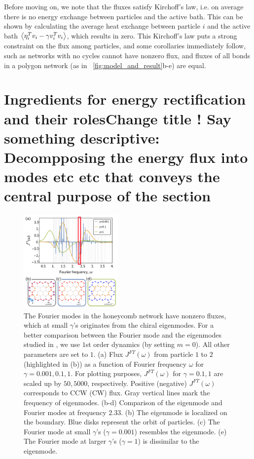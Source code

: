 \documentclass[
 preprint,
 preprintnumbers,
 amsmath,amssymb,
 aps,
 pre,
 longbibliography,
 10pt, twocolumn
]{revtex4-1}
\begin{document}
Before moving on, we note that the fluxes satisfy Kirchoff's law, i.e. on average there is no energy exchange between particles and the active bath. This can be shown by calculating the average heat exchange between particle $i$ and the active bath $\expval{\eta_i^T v_i - \gamma v_i^T v_i}$, which results in zero.
This Kirchoff's law puts a strong constraint on the flux among particles, and some corollaries immediately follow, such as networks with no cycles cannot have nonzero flux, and fluxes of all bonds in a polygon network (as in \figurename~\ref{fig:model_and_result}b-e) are equal.


\section{Ingredients for energy rectification and their roles{\bf Change title ! Say something descriptive: Decompposing the energy flux into modes etc etc that conveys the central purpose of the section}} \label{sec:fourier}

\begin{figure}[ht]
	\centering
	\includegraphics[width=0.45\textwidth]{2_Fourier_modes.pdf}
    \caption{The Fourier modes in the honeycomb network have nonzero fluxes, which at small $\gamma$'s originates from the chiral eigenmodes. For a better comparison between the Fourier mode and the eigenmodes studied in \cite{Nash2015TopologicalMetamaterials}, we use $1$st order dynamics (by setting $m=0$). All other parameters are set to $1$. 
    (a) Flux $J^{FT}(\omega)$ from particle $1$ to $2$ (highlighted in (b)) as a function of Fourier frequency $\omega$ for $\gamma=0.001,0.1,1$. For plotting purposes, $J^{FT}(\omega)$ for $\gamma=0.1,1$ are scaled up by $50,5000$, respectively. Positive (negative) $J^{FT}(\omega)$ corresponds to CCW (CW) flux. Gray vertical lines mark the frequency of eigenmodes. 
    (b-d) Comparison of the eigenmode and Fourier modes at frequency $2.33$.
    (b) The eigenmode is localized on the boundary. Blue disks represent the orbit of particles. 
    (c) The Fourier mode at small $\gamma$'s ($\gamma=0.001$) resembles the eigenmode.
    (e) The Fourier mode at larger $\gamma$'s ($\gamma=1$) is dissimilar to the eigenmode.
    }
    \label{fig:Fourier_modes}
\end{figure}
\end{document}

